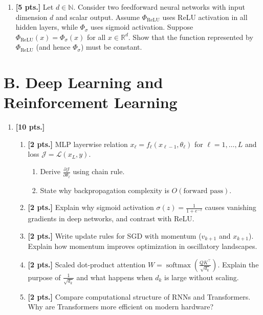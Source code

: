 \documentclass[11pt,a4paper]{article}
\DeclareMathOperator{\softmax}{softmax}
\begin{document}
\begin{enumerate}[label=\textbf{(\arabic*)}]
    \item \textbf{[5 pts.]} Let $d \in \mathbb{N}$. Consider two feedforward neural networks with input dimension $d$ and scalar output. Assume $\Phi_{\text{ReLU}}$ uses ReLU activation in all hidden layers, while $\Phi_\sigma$ uses sigmoid activation. Suppose $\Phi_{\text{ReLU}}(x) = \Phi_\sigma(x)$ for all $x \in \mathbb{R}^d$. Show that the function represented by $\Phi_{\text{ReLU}}$ (and hence $\Phi_\sigma$) must be constant.
\end{enumerate}

\section*{B. Deep Learning and Reinforcement Learning}

\begin{enumerate}[label=\textbf{(\arabic*)}]
    \item \textbf{[10 pts.]}
    \begin{enumerate}[label=(\a*)]
        \item \textbf{[2 pts.]} MLP layerwise relation $x_\ell = f_\ell(x_{\ell-1}, \theta_\ell)$ for $\ell = 1, \dots, L$ and loss $\mathcal{J} = \mathcal{L}(x_L, y)$.
        \begin{enumerate}[label=(\roman*)]
            \item Derive $\frac{\partial \mathcal{J}}{\partial \theta_\ell}$ using chain rule.
            \item State why backpropagation complexity is $O(\text{forward pass})$.
        \end{enumerate}
        \item \textbf{[2 pts.]} Explain why sigmoid activation $\sigma(z) = \frac{1}{1 + e^{-z}}$ causes vanishing gradients in deep networks, and contrast with ReLU.
        \item \textbf{[2 pts.]} Write update rules for SGD with momentum ($v_{k+1}$ and $x_{k+1}$). Explain how momentum improves optimization in oscillatory landscapes.
        \item \textbf{[2 pts.]} Scaled dot-product attention $W = \softmax\left(\frac{Q K^\top}{\sqrt{d_k}}\right)$. Explain the purpose of $\frac{1}{\sqrt{d_k}}$ and what happens when $d_k$ is large without scaling.
        \item \textbf{[2 pts.]} Compare computational structure of RNNs and Transformers. Why are Transformers more efficient on modern hardware?
    \end{enumerate}


\end{enumerate}
\end{document}
